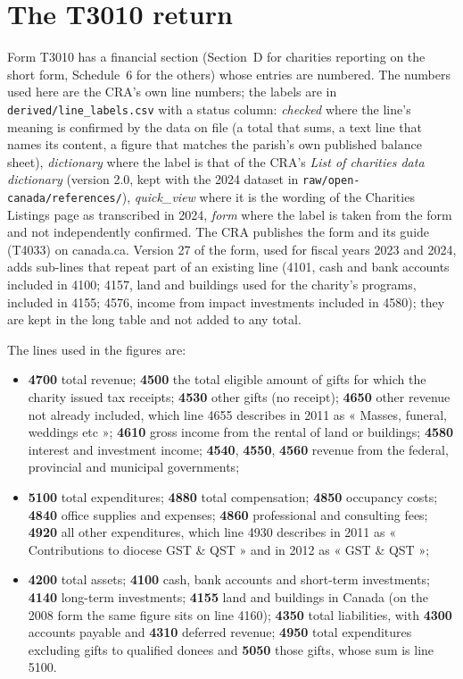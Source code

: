 \documentclass[11pt,letterpaper]{article}
\begin{document}
\section{The T3010 return}

Form T3010 has a financial section (Section~D for charities reporting on the short form, Schedule~6 for the others) whose entries are numbered. The numbers used here are the CRA's own line numbers; the labels are in \texttt{derived/line\_labels.csv} with a status column: \emph{checked} where the line's meaning is confirmed by the data on file (a total that sums, a text line that names its content, a figure that matches the parish's own published balance sheet), \emph{dictionary} where the label is that of the CRA's \emph{List of charities data dictionary} (version 2.0, kept with the 2024 dataset in \texttt{raw/open-canada/references/}), \emph{quick\_view} where it is the wording of the Charities Listings page as transcribed in 2024, \emph{form} where the label is taken from the form and not independently confirmed. The CRA publishes the form and its guide (T4033) on canada.ca. Version 27 of the form, used for fiscal years 2023 and 2024, adds sub-lines that repeat part of an existing line (4101, cash and bank accounts included in 4100; 4157, land and buildings used for the charity's programs, included in 4155; 4576, income from impact investments included in 4580); they are kept in the long table and not added to any total.

The lines used in the figures are:
\begin{itemize}[nosep,leftmargin=1.4em]
\item \textbf{4700} total revenue; \textbf{4500} the total eligible amount of gifts for which the charity issued tax receipts; \textbf{4530} other gifts (no receipt); \textbf{4650} other revenue not already included, which line 4655 describes in 2011 as « Masses, funeral, weddings etc »; \textbf{4610} gross income from the rental of land or buildings; \textbf{4580} interest and investment income; \textbf{4540}, \textbf{4550}, \textbf{4560} revenue from the federal, provincial and municipal governments;
\item \textbf{5100} total expenditures; \textbf{4880} total compensation; \textbf{4850} occupancy costs; \textbf{4840} office supplies and expenses; \textbf{4860} professional and consulting fees; \textbf{4920} all other expenditures, which line 4930 describes in 2011 as « Contributions to diocese GST \& QST » and in 2012 as « GST \& QST »;
\item \textbf{4200} total assets; \textbf{4100} cash, bank accounts and short-term investments; \textbf{4140} long-term investments; \textbf{4155} land and buildings in Canada (on the 2008 form the same figure sits on line 4160); \textbf{4350} total liabilities, with \textbf{4300} accounts payable and \textbf{4310} deferred revenue; \textbf{4950} total expenditures excluding gifts to qualified donees and \textbf{5050} those gifts, whose sum is line 5100.
\end{itemize}
\end{document}
